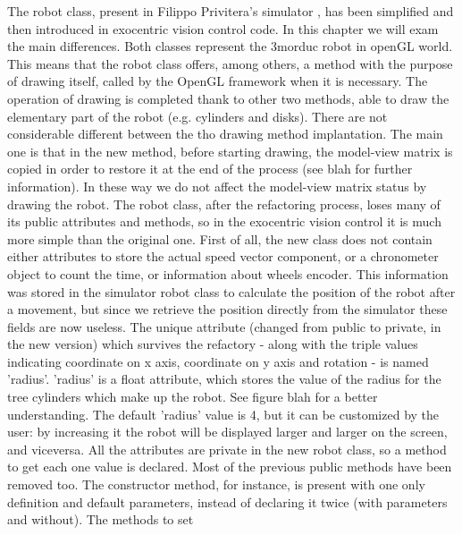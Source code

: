 The robot class, present in Filippo Privitera's simulator \cite{privitera}, has been simplified and then introduced in
exocentric vision control code. In this chapter we will exam the main differences.
\newline Both classes represent the 3morduc robot in openGL world. This means that the robot class offers, among others, a
method with the purpose of drawing itself, called by the OpenGL framework when it is necessary. The operation of drawing is
completed thank to other two methods, able to draw the elementary part of the robot (e.g. cylinders and disks).
\newline There are not considerable different between the tho drawing method implantation. The main one is that in the new method,
before starting drawing, the model-view matrix is copied in order to restore it at the end of the process (see blah for further
information). In these way we do not affect the model-view matrix status by drawing the robot.
\newline The robot class, after the refactoring process, loses many of its public attributes and methods, so in the
exocentric vision control it is much more simple than the original one. First of all, the new class does not contain either
attributes to store the actual speed vector component, or a chronometer object to count the time, or information about wheels
encoder. This information was stored in the simulator robot class to calculate the position of the robot after a movement,
but since we retrieve the position directly from the simulator these fields are now useless. 
\newline The unique attribute (changed from public to private, in the new version) which survives the refactory - along with the
triple values indicating coordinate on x axis, coordinate on y axis and rotation - is named 'radius'. 'radius' is a float
attribute, which stores the value of the radius for the tree cylinders which make up the robot. See figure blah for a better
understanding. The default 'radius' value is 4, but it can be customized by the user: by increasing it the robot will be 
displayed larger and larger on the screen, and viceversa.
\newline All the attributes are private in the new robot class, so a method to get each one value is declared.
\newline Most of the previous public methods have been removed too. The constructor method, for instance, is present with one
only definition and default parameters, instead of declaring it twice (with parameters and without). The methods to set
